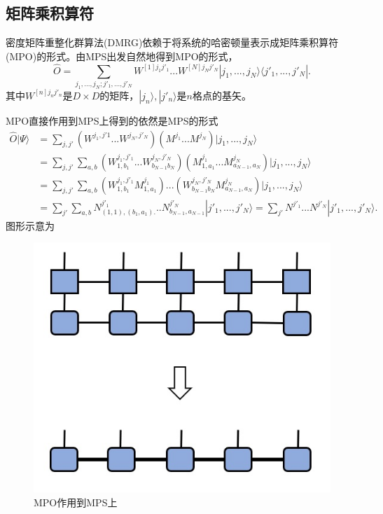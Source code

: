 \documentclass[12pt]{article}
\begin{document}
	  \subsection{矩阵乘积算符}
	  密度矩阵重整化群算法(DMRG)依赖于将系统的哈密顿量表示成矩阵乘积算符(MPO)的形式。由MPS出发自然地得到MPO的形式，\cite{pirvu2010matrix}\cite{schollwock2011density}
	  \begin{equation}\hat{O}=\sum_{j_1,...,j_N;j'_1,...,j'_N} W^{[1]j_1j'_1}...W^{[N]j_Nj'_N}|j_1,...,j_N\rangle\langle j'_1,...,j'_N|.\end{equation}
	  其中$W^{[n]j_nj'_n}$是$D\times D$的矩阵，$|j_n\rangle,|j'_n\rangle$是$n$格点的基矢。
	  
	  MPO直接作用到MPS上得到的依然是MPS的形式
	  \begin{equation}\begin{split}
	  	\hat{O}|\Psi\rangle &=\sum_{j,j'}(W^{j_1,j'1}...W^{j_N,j'_N})(M^{j_1}...M^{j_N})|j_1,...,j_N\rangle \\
	  	&=\sum_{j,j'}\sum_{a,b}(W^{j_1,j'_1}_{1,b_1}...W^{j_N,j'_N}_{b_{N-1}b_N})(M^{j_1}_{1,a_1}...M^{j_N}_{a_{N-1},a_N})|j_1,...,j_N\rangle\\
	  	&=\sum_{j,j'}\sum_{a,b}(W_{1,b_1}^{j_1,j'_1}M^{j_1}_{1,a_1})...(W^{j_N,j'_N}_{b_{N-1}b_N}M^{j_N}_{a_{N-1},a_N})|j_1,...,j_N\rangle\\
	  	&=\sum_{j'}\sum_{a,b}N^{j'_1}_{(1,1),(b_1,a_1).}..N^{j'_N}_{b_{N-1},a_{N-1}}|j'_1,...,j'_N\rangle
	  	=\sum_{j'}N^{j'_1}...N^{j'_N}|j'_1,...,j'_N\rangle
	  .\end{split}\end{equation}
      图形示意为
      \begin{figure}[H]
      	\centering
      	\includegraphics[scale=0.7]{8.MPO作用到MPS上}
      	\caption[9pt]{ MPO作用到MPS上}
      	\label{fig:8}
      \end{figure}
	  
\end{document}
